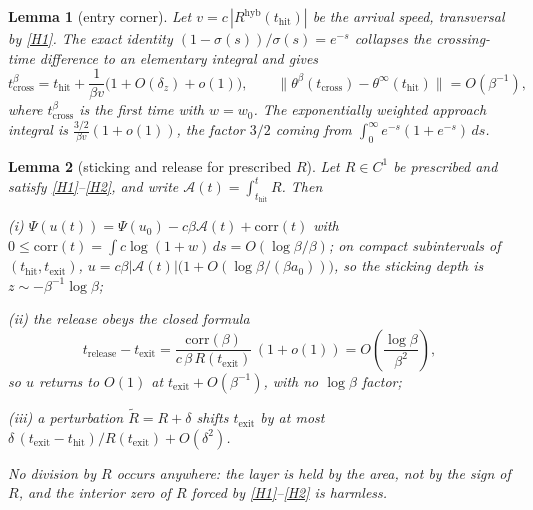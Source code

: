 \documentclass[11pt]{article}
\newtheorem{lemma}[lemma]{Lemma}
\theoremstyle{definition}
\theoremstyle{remark}
\newcommand{\thit}{t_{\mathrm{hit}}}
\newcommand{\texit}{t_{\mathrm{exit}}}
\newcommand{\trel}{t_{\mathrm{release}}}
\newcommand{\Ar}{\mathcal{A}}                      %
\newcommand{\hyb}{\mathrm{hyb}}
\begin{document}
\begin{lemma}[entry corner]\label{lem:corner-in}
Let $v=c\,|R^{\hyb}(\thit)|$ be the arrival speed, transversal by \eqref{H1}. The
exact identity $(1-\sigma(s))/\sigma(s)=e^{-s}$ collapses the crossing-time
difference to an elementary integral and gives
\begin{equation}\label{eq:corner-in}
t_{\mathrm{cross}}^{\beta}=\thit+\frac{1}{\beta v}\bigl(1+O(\delta_z)+o(1)\bigr),
\qquad
\bigl\|\theta^\beta(t_{\mathrm{cross}})-\theta^\infty(\thit)\bigr\|=O(\beta^{-1}),
\end{equation}
where $t^\beta_{\mathrm{cross}}$ is the first time with $w=w_0$. The
exponentially weighted approach integral is $\tfrac{3/2}{\beta v}(1+o(1))$, the
factor $3/2$ coming from $\int_0^\infty e^{-s}(1+e^{-s})\,ds$.
\end{lemma}

\begin{lemma}[sticking and release for prescribed $R$]\label{lem:release}
Let $R\in C^1$ be prescribed and satisfy \eqref{H1}--\eqref{H2}, and write
$\Ar(t)=\int_{\thit}^{t}R$. Then

(i) $\Psi(u(t))=\Psi(u_0)-c\beta\Ar(t)+\mathrm{corr}(t)$ with
$0\le\mathrm{corr}(t)=\int c\log(1+w)\,ds=O(\log\beta/\beta)$; on compact
subintervals of $(\thit,\texit)$,
$u=c\beta|\Ar(t)|\bigl(1+O(\log\beta/(\beta a_0))\bigr)$, so the sticking depth is
$z\sim-\beta^{-1}\log\beta$;

(ii) the release obeys the closed formula
\begin{equation}\label{eq:release-prescribed}
\trel-\texit=\frac{\mathrm{corr}(\beta)}{c\,\beta\,R(\texit)}\,(1+o(1))
=O\!\left(\frac{\log\beta}{\beta^{2}}\right),
\end{equation}
so $u$ returns to $O(1)$ at $\texit+O(\beta^{-1})$, with no $\log\beta$ factor;

(iii) a perturbation $\tilde R=R+\delta$ shifts $\texit$ by at most
$\delta\,(\texit-\thit)/R(\texit)+O(\delta^{2})$.

No division by $R$ occurs anywhere: the layer is held by the area, not by the
sign of $R$, and the interior zero of $R$ forced by \eqref{H1}--\eqref{H2} is
harmless.
\end{lemma}
\end{document}
